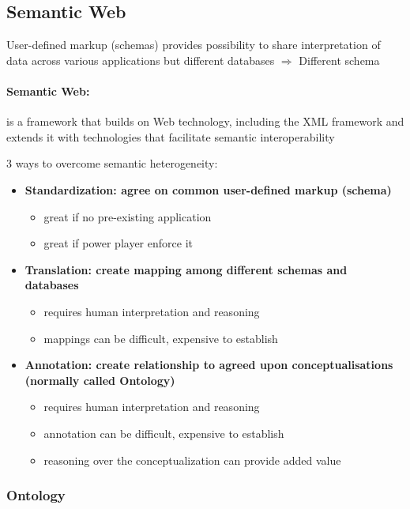 \subsection{Semantic Web}
User-defined markup (schemas) provides possibility to share interpretation of data across various applications but different databases $\Rightarrow$ Different schema


\paragraph{Semantic Web:} is a framework that builds on Web technology, including the XML framework and extends it with technologies that facilitate semantic interoperability

3 ways to overcome semantic heterogeneity:

\begin{itemize}
\item \bf{Standardization:} agree on common user-defined markup (schema)
	\begin{itemize}
		\item great if no pre-existing application
		\item great if power player enforce it
	\end{itemize}	
\item \bf{ Translation:} create mapping among different schemas and databases
	\begin{itemize}
		\item requires human interpretation and reasoning
		\item mappings can be difficult, expensive to establish
	\end{itemize}
\item \bf{Annotation:} create relationship to agreed upon conceptualisations (normally called Ontology)
	\begin{itemize}
		\item requires human interpretation and reasoning
		\item annotation can be difficult, expensive to establish
		\item reasoning over the conceptualization can provide added value
	\end{itemize}		
\end{itemize}

\subsubsection{Ontology}

